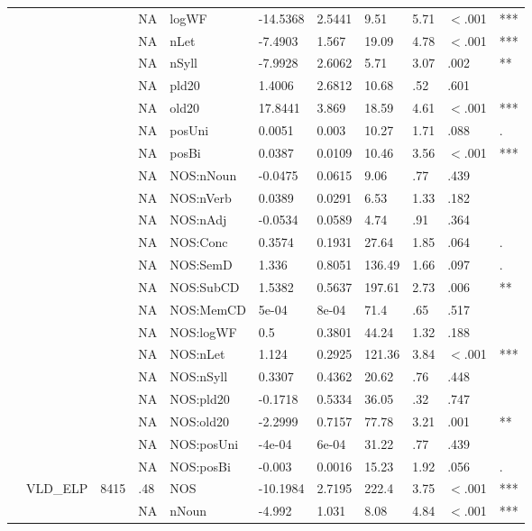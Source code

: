 \begin{table}[ht]
\begin{tabular}{lllllllllll}
   &  &  & NA & logWF & -14.5368 & 2.5441 & 9.51 & 5.71 & $<$.001 & *** \\ 
   &  &  & NA & nLet & -7.4903 & 1.567 & 19.09 & 4.78 & $<$.001 & *** \\ 
   &  &  & NA & nSyll & -7.9928 & 2.6062 & 5.71 & 3.07 & .002 & ** \\ 
   &  &  & NA & pld20 & 1.4006 & 2.6812 & 10.68 & .52 & .601 &   \\ 
   &  &  & NA & old20 & 17.8441 & 3.869 & 18.59 & 4.61 & $<$.001 & *** \\ 
   &  &  & NA & posUni & 0.0051 & 0.003 & 10.27 & 1.71 & .088 & . \\ 
   &  &  & NA & posBi & 0.0387 & 0.0109 & 10.46 & 3.56 & $<$.001 & *** \\ 
   &  &  & NA & NOS:nNoun & -0.0475 & 0.0615 & 9.06 & .77 & .439 &   \\ 
   &  &  & NA & NOS:nVerb & 0.0389 & 0.0291 & 6.53 & 1.33 & .182 &   \\ 
   &  &  & NA & NOS:nAdj & -0.0534 & 0.0589 & 4.74 & .91 & .364 &   \\ 
   &  &  & NA & NOS:Conc & 0.3574 & 0.1931 & 27.64 & 1.85 & .064 & . \\ 
   &  &  & NA & NOS:SemD & 1.336 & 0.8051 & 136.49 & 1.66 & .097 & . \\ 
   &  &  & NA & NOS:SubCD & 1.5382 & 0.5637 & 197.61 & 2.73 & .006 & ** \\ 
   &  &  & NA & NOS:MemCD & 5e-04 & 8e-04 & 71.4 & .65 & .517 &   \\ 
   &  &  & NA & NOS:logWF & 0.5 & 0.3801 & 44.24 & 1.32 & .188 &   \\ 
   &  &  & NA & NOS:nLet & 1.124 & 0.2925 & 121.36 & 3.84 & $<$.001 & *** \\ 
   &  &  & NA & NOS:nSyll & 0.3307 & 0.4362 & 20.62 & .76 & .448 &   \\ 
   &  &  & NA & NOS:pld20 & -0.1718 & 0.5334 & 36.05 & .32 & .747 &   \\ 
   &  &  & NA & NOS:old20 & -2.2999 & 0.7157 & 77.78 & 3.21 & .001 & ** \\ 
   &  &  & NA & NOS:posUni & -4e-04 & 6e-04 & 31.22 & .77 & .439 &   \\ 
   &  &  & NA & NOS:posBi & -0.003 & 0.0016 & 15.23 & 1.92 & .056 & . \\ 
   & VLD\_ELP & 8415 & .48 & NOS & -10.1984 & 2.7195 & 222.4 & 3.75 & $<$.001 & *** \\ 
   &  &  & NA & nNoun & -4.992 & 1.031 & 8.08 & 4.84 & $<$.001 & *** \\ 

\end{tabular}
\end{table}
